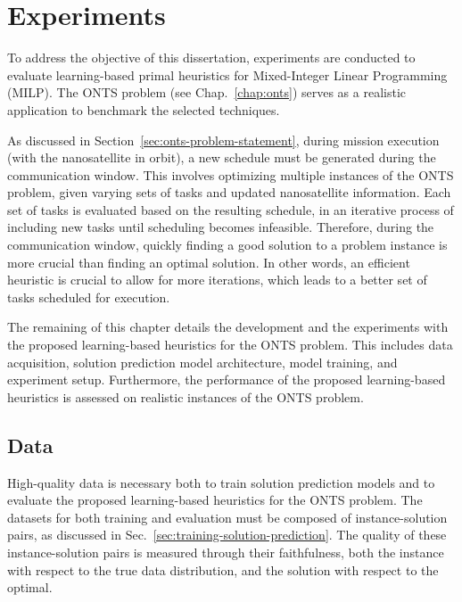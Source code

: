 

\chapter{Experiments}\label{chap:experiments}

To address the objective of this dissertation, experiments are conducted to evaluate learning-based primal heuristics for Mixed-Integer Linear Programming (MILP).
The ONTS problem (see Chap.~\ref{chap:onts}) serves as a realistic application to benchmark the selected techniques.

As discussed in Section~\ref{sec:onts-problem-statement}, during mission execution (with the nanosatellite in orbit), a new schedule must be generated during the communication window.
This involves optimizing multiple instances of the ONTS problem, given varying sets of tasks and updated nanosatellite information.
Each set of tasks is evaluated based on the resulting schedule, in an iterative process of including new tasks until scheduling becomes infeasible.
Therefore, during the communication window, quickly finding a good solution to a problem instance is more crucial than finding an optimal solution.
In other words, an efficient heuristic is crucial to allow for more iterations, which leads to a better set of tasks scheduled for execution.

The remaining of this chapter details the development and the experiments with the proposed learning-based heuristics for the ONTS problem.
This includes data acquisition, solution prediction model architecture, model training, and experiment setup.
Furthermore, the performance of the proposed learning-based heuristics is assessed on realistic instances of the ONTS problem.


\section{Data}

High-quality data is necessary both to train solution prediction models and to evaluate the proposed learning-based heuristics for the ONTS problem.
The datasets for both training and evaluation must be composed of instance-solution pairs, as discussed in Sec.~\ref{sec:training-solution-prediction}.
The quality of these instance-solution pairs is measured through their faithfulness, both the instance with respect to the true data distribution, and the solution with respect to the optimal.

